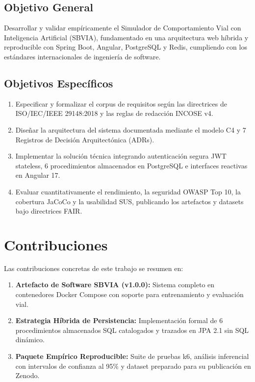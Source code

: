 \documentclass[11pt,a4paper]{report}
\begin{document}
\subsection{Objetivo General}
Desarrollar y validar empíricamente el Simulador de Comportamiento Vial con Inteligencia Artificial (SBVIA), fundamentado en una arquitectura web híbrida y reproducible con Spring Boot, Angular, PostgreSQL y Redis, cumpliendo con los estándares internacionales de ingeniería de software.

\subsection{Objetivos Específicos}
\begin{enumerate}
    \item Especificar y formalizar el corpus de requisitos según las directrices de ISO/IEC/IEEE 29148:2018 y las reglas de redacción INCOSE v4.
    \item Diseñar la arquitectura del sistema documentada mediante el modelo C4 y 7 Registros de Decisión Arquitectónica (ADRs).
    \item Implementar la solución técnica integrando autenticación segura JWT stateless, 6 procedimientos almacenados en PostgreSQL e interfaces reactivas en Angular 17.
    \item Evaluar cuantitativamente el rendimiento, la seguridad OWASP Top 10, la cobertura JaCoCo y la usabilidad SUS, publicando los artefactos y datasets bajo directrices FAIR.
\end{enumerate}

\section{Contribuciones}
Las contribuciones concretas de este trabajo se resumen en:
\begin{enumerate}
    \item \textbf{Artefacto de Software SBVIA (v1.0.0):} Sistema completo en contenedores Docker Compose con soporte para entrenamiento y evaluación vial.
    \item \textbf{Estrategia Híbrida de Persistencia:} Implementación formal de 6 procedimientos almacenados SQL catalogados y trazados en JPA 2.1 sin SQL dinámico.
    \item \textbf{Paquete Empírico Reproducible:} Suite de pruebas k6, análisis inferencial con intervalos de confianza al 95\% y dataset preparado para su publicación en Zenodo.
\end{enumerate}
\end{document}
